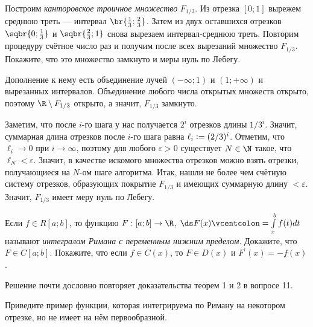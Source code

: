 \begin{problem}[6$^\circ$]
    Построим \textit{канторовское троичное множество} $F_{1 / 3}$. Из отрезка $[0; 1]$ вырежем среднюю треть --- интервал $\br{\frac{1}{3}; \frac{2}{3}}$. Затем из двух оставшихся отрезков $\sqbr{0; \frac{1}{3}}$ и $\sqbr{\frac{2}{3}; 1}$ снова вырезаем интервал-среднюю треть. Повторим процедуру счётное число раз и получим после всех вырезаний множество $F_{1 / 3}$. Покажите, что это множество замкнуто и меры нуль по Лебегу.
\end{problem}

\begin{solution}
    Дополнение к нему есть объединение лучей $(-\infty; 1)$ и $(1; +\infty)$ и вырезанных интервалов. Объединение любого числа открытых множеств открыто, поэтому $\R \setminus F_{1 / 3}$ открыто, а значит, $F_{1 / 3}$ замкнуто.

    Заметим, что после $i$-го шага у нас получается $2^i$ отрезков длины $1 / 3^i$. Значит, суммарная длина отрезков после $i$-го шага равна $\ell_i \vcentcolon = (2 / 3)^i$. Отметим, что $\ell_i \to 0$ при $i \to \infty$, поэтому для любого $\varepsilon > 0$ существует $N \in \N$ такое, что $\ell_N < \varepsilon$. Значит, в качестве искомого множества отрезков можно взять отрезки, получающиеся на $N$-ом шаге алгоритма. Итак, нашли не более чем счётную систему отрезков, образующих покрытие $F_{1 / 3}$ и имеющих суммарную длину $< \varepsilon$. Значит, $F_{1 / 3}$ имеет меру нуль по Лебегу.
\end{solution}

\begin{problem}[11$^\circ$]
    Если $f \in R[a; b]$, то функцию $F: [a; b] \to \R$, $\ds F(x) \vcentcolon = \int\limits_x^bf(t)dt$ называют \textit{интегралом Римана с переменным нижним пределом}. Докажите, что $F \in C[a; b]$. Покажите, что если $f \in C(x)$, то $F \in D(x)$ и $F^\prime(x) = -f(x)$.
\end{problem}

\begin{solution}
    Решение почти дословно повторяет доказательства теорем 1 и 2 в вопросе 11.
\end{solution}

\begin{problem}[12$^\circ$]
    Приведите пример функции, которая интегрируема по Риману на некотором отрезке, но не имеет на нём первообразной.
\end{problem}

